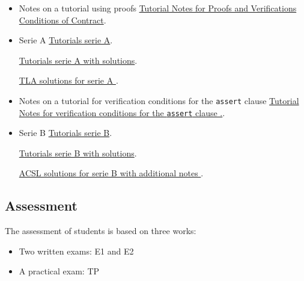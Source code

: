 \documentclass[ 12pt]{article}
\begin{document}
\begin{itemize}
  
\item[]  Notes on a tutorial using proofs 
    \href{http://mery54.github.io/teaching/movex/lecturesnotes/notestuto3.pdf}{Tutorial
      Notes for Proofs and Verifications Conditions of Contract}.

  \item[]   Serie  A
    \href{http://mery54.github.io/teaching/movex/lecturesnotes/movexserieA.pdf}{Tutorials 
      serie A}.

          \href{http://mery54.github.io/teaching/movex/lecturesnotes/correctionmovexserieA.pdf}{Tutorials 
      serie A with solutions}. 

    
        \href{http://mery54.github.io/teaching/movex/models/serieA.zip}{TLA 
          solutions for serie A }.

\item[]  Notes on a tutorial    for verification  conditions for the
  \texttt{assert} clause 
    \href{http://mery54.github.io/teaching/movex/lecturesnotes/notestuto4.pdf}{Tutorial
      Notes for   verification  conditions for the \texttt{assert} clause .}.

        
\item[]   Serie  B
    \href{http://mery54.github.io/teaching/movex/lecturesnotes/movexserieB.pdf}{Tutorials 
      serie B}.

      \href{http://mery54.github.io/teaching/movex/lecturesnotes/correctionmovexserieB.pdf}{Tutorials 
            serie B with solutions}. 

           \href{http://mery54.github.io/teaching/movex/models/serieB.zip}{
             ACSL  
             solutions for serie B with additional notes 
             }.
  \end{itemize}




  
  
  
  \subsection{Assessment}
\label{sec:project}

The assessment  of students is based on three works:
\begin{itemize}
\item Two  written  exams: E1 and E2
\item  A practical exam: TP
 \end{itemize}
\end{document}
